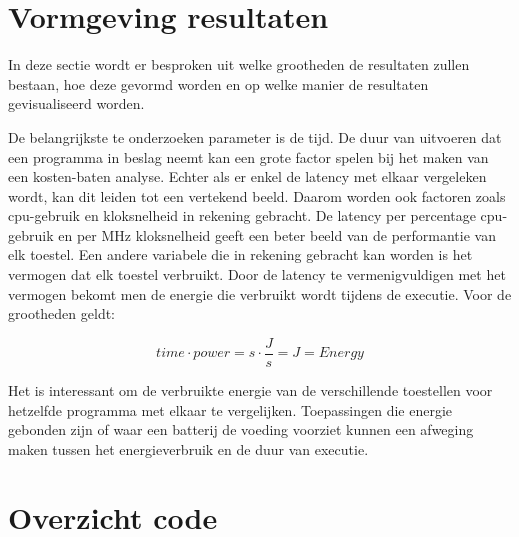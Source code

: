 \section{Vormgeving resultaten}
In deze sectie wordt er besproken uit welke grootheden de resultaten zullen bestaan, hoe deze gevormd worden en op welke manier de resultaten gevisualiseerd worden. 

De belangrijkste te onderzoeken parameter is de tijd. De duur van uitvoeren dat een programma in beslag neemt kan een grote factor spelen bij het maken van een kosten-baten analyse. Echter als er enkel de latency met elkaar vergeleken wordt, kan dit leiden tot een vertekend beeld. Daarom worden ook factoren zoals \gls{cpu}-gebruik en kloksnelheid in rekening gebracht. De latency per percentage \gls{cpu}-gebruik en per MHz kloksnelheid geeft een beter beeld van de performantie van elk toestel. Een andere variabele die in rekening gebracht kan worden is het vermogen dat elk toestel verbruikt. Door de latency te vermenigvuldigen met het vermogen bekomt men de energie die verbruikt wordt tijdens de executie. Voor de grootheden geldt:

\begin{equation}
	time \cdot power = s \cdot \frac{J}{s} = J = Energy	
\end{equation}

Het is interessant om de verbruikte energie van de verschillende toestellen voor hetzelfde programma met elkaar te vergelijken. Toepassingen die energie gebonden zijn of waar een batterij de voeding voorziet kunnen een afweging maken tussen het energieverbruik en de duur van executie.

\section{Overzicht code}







